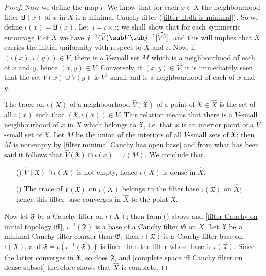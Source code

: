 \begin{proof}
Now we define the map $\iota$. We know that for each $x\in X$ the neighbourhood filter $\mathfrak{U}(x)$ of $x$ in $X$ is a minimal Cauchy filter (\cref{filter nbdh is minimal}). So we define $\iota(x)=\mathfrak{U}(x)$. Let $j=\iota\times\iota$; we shall show that for each symmetric entourage $V$ of $X$ we have $j^{-1}(\widehat{V})\sub V\sub j^{-1}[\widehat{V^3}]$, and this will implies that $X$ carries the initial uniformity with respect to $\widehat{X}$ and $\iota$. Now, if $(\iota(x),\iota(y))\in\widehat{V}$, there is a $V$-small set $M$ which is a neighbourhood of each of $x$ and $y$, hence $(x,y)\in V$. Conversely, if $(x,y)\in V$, it is immediately seen that the set $V(x)\cup V(y)$ is $V^3$-small and is a neighbourhood of each of $x$ and $y$.\par
The trace on $\iota(X)$ of a neighbourhood $\widehat{V}(\mathfrak{X})$ of a point of $\mathfrak{X}\in\widehat{X}$ is the set of all $\iota(x)$ such that $(\mathfrak{X},\iota(x))\in\widehat{V}$. This relation means that there is a $V$-small neighbourhood of $x$ in $X$ which belongs to $\mathfrak{X}$, i.e. that $x$ is an interior point of a $V$-small set of $\mathfrak{X}$. Let $M$ be the union of the interiors of all $V$-small sets of $\mathfrak{X}$; then $M$ is nonempty by \cref{filter minimal Cauchy has open base} and from what has been said it follows that $\widehat{V}(\mathfrak{X})\cap\iota(x)=\iota(M)$. We conclude that 
\begin{itemize}
\item[(\rmnum{1})] $\widehat{V}(\mathfrak{X})\cap\iota(X)$ is not empty, hence $\iota(X)$ is dense in $\widehat{X}$.
\item[(\rmnum{2})] The trace of $\widehat{V}(\mathfrak{X})$ on $\iota(X)$ belongs to the filter base $\iota(\mathfrak{X})$ on $\widehat{X}$; hence this filter base converges in $\widehat{X}$ to the point $\mathfrak{X}$.
\end{itemize}
Now let $\mathfrak{F}$ be a Cauchy filter on $\iota(X)$; then from () above and \cref{filter Cauchy on initial topology iff}, $\iota^{-1}(\mathfrak{F})$ is a base of a Cauchy filter $\mathfrak{G}$ on $X$. Let $\mathfrak{X}$ be a minimal Cauchy filter coarser than $\mathfrak{G}$; then $\iota(\mathfrak{X})$ is a Cauchy filter base on $\iota(X)$, and $\mathfrak{F}=\iota(\iota^{-1}(\mathfrak{F}))$ is finer than the filter whose base is $\iota(\mathfrak{X})$. Since the latter converges in $\mathfrak{X}$, so does $\mathfrak{F}$, and \cref{complete space iff Cauchy filter on dense subset} therefore shows that $\widehat{X}$ is complete.\par

\end{proof}
